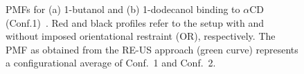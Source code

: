 \documentclass[9pt,lessons,pubversion]{livecoms}
\begin{document}
\begin{figure}[htb!]
  \centering    
  \caption{PMFs for (a) 1-butanol and (b) 1-dodecanol binding to $\alpha$CD (Conf.1)~\cite{markthaler2017molecular, gebhardt2016calculation}. 
  Red and black profiles refer to the setup with and without imposed orientational restraint (OR), respectively.
  The PMF as obtained from the RE-US approach (green curve) represents a configurational average of Conf.~1 and Conf.~2.
  }
  \label{fig:PMF_aCD}
\end{figure}
\end{document}
